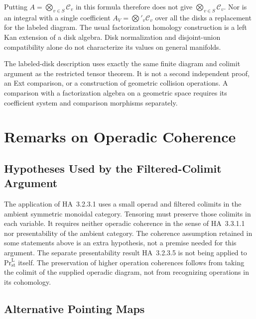 Putting \(A=\bigotimes_{v\in S}\mathcal C_v\) in this formula
therefore does not give \(\bigotimes_{v\in S}\mathcal C_v\).
Nor is an integral with a single coefficient
\(A_V=\bigotimes'_v\mathcal C_v\) over all the disks a
replacement for the labeled diagram. The usual factorization
homology construction is a left Kan extension of a disk algebra.
Disk normalization and disjoint-union compatibility alone do
not characterize its values on general manifolds.

\begin{remark}
\label{v4-arith:tate:rem:ginot-ext-verification}
The labeled-disk description uses exactly the same finite
diagram and colimit argument as the restricted tensor theorem.
It is not a second independent proof, an Ext comparison, or a
construction of geometric collision operations. A comparison
with a factorization algebra on a geometric space requires its
coefficient system and comparison morphisms separately.
\end{remark}

\section{Remarks on Operadic Coherence}
\label{v4-arith:tate:coherence-remarks}

\subsection{Hypotheses Used by the Filtered-Colimit Argument}

The application of HA~3.2.3.1 uses a small operad and filtered
colimits in the ambient symmetric monoidal category.
Tensoring must preserve those colimits in each variable.
It requires neither operadic coherence in the sense of
HA~3.3.1.1 nor presentability of the ambient category. The
coherence assumption retained in some statements above is an
extra hypothesis, not a premise needed for this argument.
The separate presentability result HA~3.2.3.5 is not being
applied to \(\mathrm{Pr}^{\mathrm L}_{\mathrm{st}}\) itself.
The preservation of higher operation coherences follows from
taking the colimit of the supplied operadic diagram, not from
recognizing operations in its cohomology.

\subsection{Alternative Pointing Maps}

